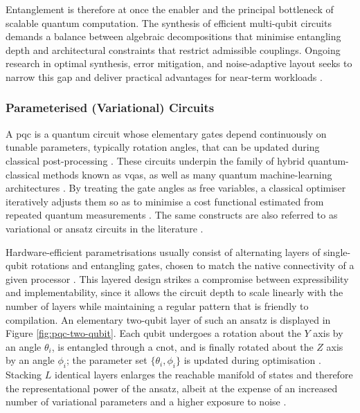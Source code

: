 Entanglement is therefore at once the enabler and the principal bottleneck of scalable quantum computation. The synthesis of efficient multi-qubit circuits demands a balance between algebraic decompositions that minimise entangling depth and architectural constraints that restrict admissible couplings. Ongoing research in optimal synthesis, error mitigation, and noise-adaptive layout seeks to narrow this gap and deliver practical advantages for near-term workloads \cite{nielsen2010quantum}.

\subsubsection*{Parameterised (Variational) Circuits}

A \gls{pqc} is a quantum circuit whose elementary gates depend continuously on tunable parameters, typically rotation angles, that can be updated during classical post-processing \cite{peruzzo2014variational}. These circuits underpin the family of hybrid quantum-classical methods known as \glspl{vqa}, as well as many quantum machine-learning architectures \cite{cerezo2021variational}. By treating the gate angles as free variables, a classical optimiser iteratively adjusts them so as to minimise a cost functional estimated from repeated quantum measurements \cite{peruzzo2014variational}. The same constructs are also referred to as variational or ansatz circuits in the literature \cite{kandala2017hardware}.

Hardware-efficient parametrisations usually consist of alternating layers of single-qubit rotations and entangling gates, chosen to match the native connectivity of a given processor \cite{kandala2017hardware}. This layered design strikes a compromise between expressibility and implementability, since it allows the circuit depth to scale linearly with the number of layers while maintaining a regular pattern that is friendly to compilation. An elementary two-qubit layer of such an ansatz is displayed in Figure \ref{fig:pqc-two-qubit}. Each qubit undergoes a rotation about the $Y$ axis by an angle $\theta_{i}$, is entangled through a \gls{cnot}, and is finally rotated about the $Z$ axis by an angle $\phi_{i}$; the parameter set $\{\theta_{i},\phi_{i}\}$ is updated during optimisation \cite{peruzzo2014variational}. Stacking $L$ identical layers enlarges the reachable manifold of states and therefore the representational power of the ansatz, albeit at the expense of an increased number of variational parameters and a higher exposure to noise \cite{sim2019expressibility}.

